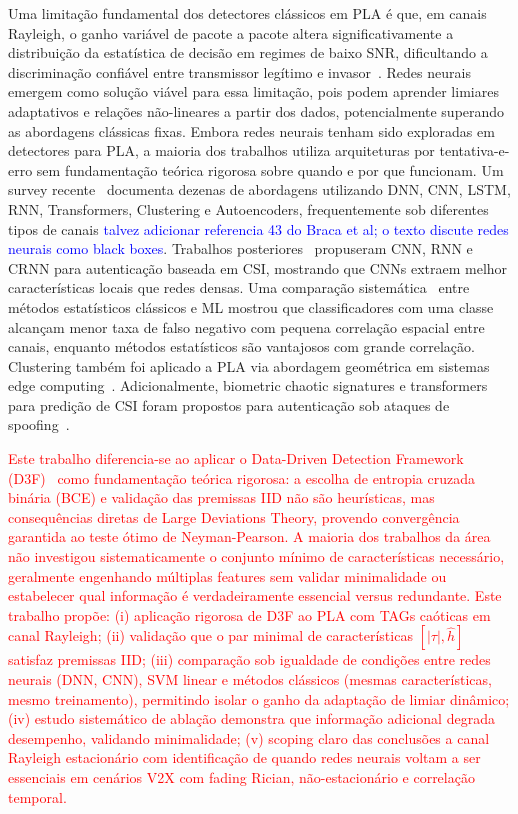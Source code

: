 \documentclass[12pt,a4paper]{article}
\newcommand{\bblue}[1]{\textcolor{blue}{#1}}
\newcommand{\rred}[1]{\textcolor{red}{#1}}
\begin{document}
Uma limitação fundamental dos detectores clássicos em PLA é que, em canais Rayleigh, o ganho variável de pacote a pacote altera significativamente a distribuição da estatística de decisão em regimes de baixo SNR, dificultando a discriminação confiável entre transmissor legítimo e invasor~\cite{ref_xie}. Redes neurais emergem como solução viável para essa limitação, pois podem aprender limiares adaptativos e relações não-lineares a partir dos dados, potencialmente superando as abordagens clássicas fixas. Embora redes neurais tenham sido exploradas em detectores para PLA, a maioria dos trabalhos utiliza arquiteturas por tentativa-e-erro sem fundamentação teórica rigorosa sobre quando e por que funcionam. Um survey recente~\cite{ref_survey_ml_pla} documenta dezenas de abordagens utilizando DNN, CNN, LSTM, RNN, Transformers, Clustering e Autoencoders, frequentemente sob diferentes tipos de canais \bblue{talvez adicionar referencia 43 do Braca et al; o texto discute redes neurais como black boxes}. Trabalhos posteriores~\cite{ref_wang_dnn_csi} propuseram CNN, RNN e CRNN para autenticação baseada em CSI, mostrando que CNNs extraem melhor características locais que redes densas. Uma comparação sistemática~\cite{ref_comparison_stat_ml} entre métodos estatísticos clássicos e ML mostrou que classificadores com uma classe alcançam menor taxa de falso negativo com pequena correlação espacial entre canais, enquanto métodos estatísticos são vantajosos com grande correlação. Clustering também foi aplicado a PLA via abordagem geométrica em sistemas edge computing~\cite{ref_clustering_pla}. Adicionalmente, biometric chaotic signatures e transformers para predição de CSI foram propostos para autenticação sob ataques de spoofing~\cite{ref_biometric_chaotic, ref_transformer_csi_pred}.

\rred{Este trabalho diferencia-se ao aplicar o Data-Driven Detection Framework (D3F)~\cite{ref_braca} como fundamentação teórica rigorosa: a escolha de entropia cruzada binária (BCE) e validação das premissas IID não são heurísticas, mas consequências diretas de Large Deviations Theory, provendo convergência garantida ao teste ótimo de Neyman-Pearson. A maioria dos trabalhos da área não investigou sistematicamente o conjunto mínimo de características necessário, geralmente engenhando múltiplas features sem validar minimalidade ou estabelecer qual informação é verdadeiramente essencial versus redundante. Este trabalho propõe: (i) aplicação rigorosa de D3F ao PLA com TAGs caóticas em canal Rayleigh; (ii) validação que o par minimal de características $[|\tau|, \hat{h}]$ satisfaz premissas IID; (iii) comparação sob igualdade de condições entre redes neurais (DNN, CNN), SVM linear e métodos clássicos (mesmas características, mesmo treinamento), permitindo isolar o ganho da adaptação de limiar dinâmico; (iv) estudo sistemático de ablação demonstra que informação adicional degrada desempenho, validando minimalidade; (v) scoping claro das conclusões a canal Rayleigh estacionário com identificação de quando redes neurais voltam a ser essenciais em cenários V2X com fading Rician, não-estacionário e correlação temporal.}
\end{document}
